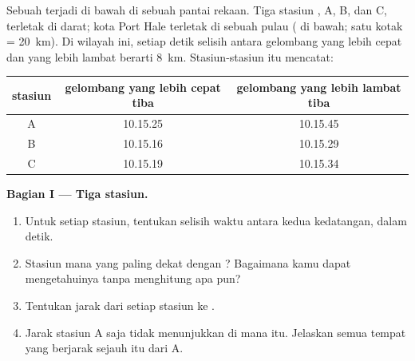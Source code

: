 \begin{problem}
\label{pb:g7:earthquakes:1}
Sebuah  terjadi di bawah  di sebuah pantai rekaan. Tiga
stasiun , A, B, dan C, terletak di darat; kota Port Hale
terletak di sebuah pulau ( di bawah; satu kotak = \qty{20}{km}). Di
wilayah ini, setiap detik selisih antara gelombang yang lebih cepat dan
yang lebih lambat berarti \qty{8}{km}. Stasiun-stasiun itu mencatat:

\begin{center}
\small
\begin{tabular}{|c|c|c|}
\hline
\textbf{stasiun} & \textbf{gelombang yang lebih cepat tiba} & \textbf{gelombang yang lebih lambat tiba} \\
\hline
A & 10.15.25 & 10.15.45 \\
B & 10.15.16 & 10.15.29 \\
C & 10.15.19 & 10.15.34 \\
\hline
\end{tabular}
\end{center}

\medskip
\noindent\textbf{Bagian I --- Tiga stasiun.}\par\nopagebreak
\begin{enumerate}[beginpenalty=10000]
  \item Untuk setiap stasiun, tentukan selisih waktu antara kedua
        kedatangan, dalam detik.
  \item Stasiun mana yang paling dekat dengan ? Bagaimana kamu
        dapat mengetahuinya tanpa menghitung apa pun?
  \item Tentukan jarak dari setiap stasiun ke .
  \item Jarak stasiun A saja tidak menunjukkan di mana  itu.
        Jelaskan semua tempat yang berjarak sejauh itu dari A.
\end{enumerate}


\end{problem}
